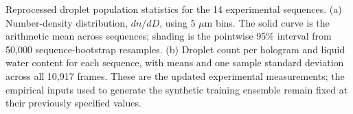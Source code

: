 Reprocessed droplet population statistics for the 14 experimental sequences. (a) Number-density distribution, \(dn/dD\), using 5 \(\mu\mathrm{m}\) bins. The solid curve is the arithmetic mean across sequences; shading is the pointwise 95\% interval from 50,000 sequence-bootstrap resamples. (b) Droplet count per hologram and liquid water content for each sequence, with means and one sample standard deviation across all 10,917 frames. These are the updated experimental measurements; the empirical inputs used to generate the synthetic training ensemble remain fixed at their previously specified values.
